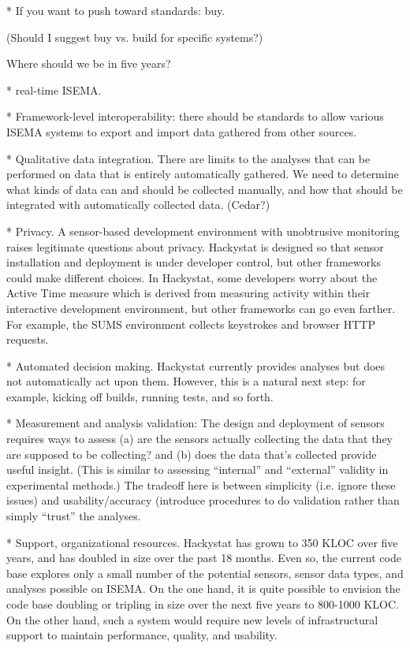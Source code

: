 \documentclass[10pt,twocolumn]{article}
\begin{document}
* If you want to push toward standards: buy.

(Should I suggest buy vs. build for specific systems?)


Where should we be in five years?

* real-time ISEMA.

* Framework-level interoperability: there should be standards to allow various ISEMA systems to export and import data gathered from other sources. 

* Qualitative data integration. There are limits to the analyses that can
  be performed on data that is entirely automatically gathered.  We need to
  determine what kinds of data can and should be collected manually, and
  how that should be integrated with automatically collected data. (Cedar?)

* Privacy.  A sensor-based development environment with unobtrusive
  monitoring raises legitimate questions about privacy.  Hackystat is
  designed so that sensor installation and deployment is under developer
  control, but other frameworks could make different choices.  In Hackystat, 
  some developers worry about the Active Time measure which is derived from 
  measuring activity within their interactive development environment, but other
  frameworks can go even farther. For example, the SUMS environment collects keystrokes
  and browser HTTP requests. 

* Automated decision making.  Hackystat currently provides analyses but does not automatically
  act upon them.  However, this is a natural next step: for example, kicking off builds, running
tests, and so forth. 

* Measurement and analysis validation: The design and deployment of sensors 
requires ways to assess (a) are the sensors actually collecting the data that 
they are supposed to be collecting? and (b) does the data that's collected provide
useful insight.  (This is similar to assessing ``internal'' and ``external'' validity in 
experimental methods.)  The tradeoff here is between simplicity (i.e. ignore these issues)
and usability/accuracy (introduce procedures to do validation rather than simply ``trust''
the analyses. 


* Support, organizational resources.  Hackystat has grown to 350 KLOC over
five years, and has doubled in size over the past 18 months. Even so, the
current code base explores only a small number of the potential sensors,
sensor data types, and analyses possible on ISEMA.  On the one hand, it is
quite possible to envision the code base doubling or tripling in size over
the next five years to 800-1000 KLOC. On the other hand, such a system
would require new levels of infrastructural support to maintain
performance, quality, and usability. 
\end{document}
